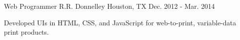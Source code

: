 \begin{cventries}

\cventry
{Web Programmer} %
{R.R. Donnelley} %
{Houston, TX} %
{Dec. 2012 - Mar. 2014} %
{
\begin{cvitems}
\item {Developed UIs in HTML, CSS, and JavaScript for web-to-print, variable-data print products.}
\end{cvitems}
}

\end{cventries}
